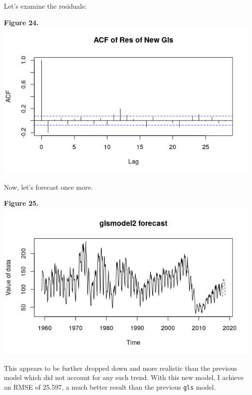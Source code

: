 \documentclass[11pt]{article}
\begin{document}
Let's examine the residuals:
\begin{center}
\textbf{Figure 24.}
\\
\includegraphics[scale=1]{newGls}
\end{center}
Now, let's forecast once more.
\begin{center}
\textbf{Figure 25.}
\\
\includegraphics[scale=1]{glsFor2}
\end{center}
This appears to be further dropped down and more realistic than the previous model which did not account for any such trend. With this new model, I achieve an RMSE of 25.597, a much better result than the previous {\tt gls} model.
\end{document}
